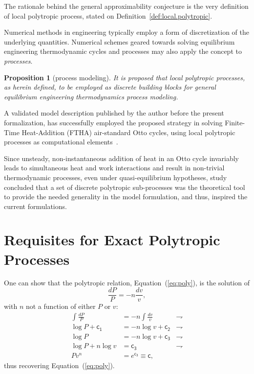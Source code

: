 \documentclass[fleqn,11pt]{SelfArx}
\newtheorem{proposition}{Proposition}
\begin{document}
    The rationale behind the general approximability conjecture is the very definition of  local
    polytropic process, stated on Definition~\ref{def:local.polytropic}.

    Numerical methods in engineering typically employ a form of discretization of the underlying
    quantities. Numerical schemes geared towards solving equilibrium  engineering  thermodynamic
    cycles and processes may also apply the concept to \emph{processes}.

    \begin{proposition}[process modeling]\label{prop:proc.model}
        It is proposed that local polytropic processes, as herein defined,  to  be  employed  as
        discrete building blocks for  general  equilibrium  engineering  thermodynamics  process
        modeling.
    \end{proposition}

    A validated model description published by the author before the present formalization,  has
    successfully employed the proposed strategy  in  solving  Finite-Time  Heat-Addition  (FTHA)
    air-standard   Otto   cycles,   using   local   polytropic   processes   as    computational
    elements~\cite{2017-NaaktgeborenC-IntJMechEngEduc}.

    Since unsteady, non-instantaneous addition of heat in an  Otto  cycle  invariably  leads  to
    simultaneous heat and work interactions and result in non-trivial  thermodynamic  processes,
    even  under  quasi-equilibrium  hypotheses,  study~\cite{2017-NaaktgeborenC-IntJMechEngEduc}
    concluded that a set of discrete  polytropic  sub-processes  was  the  theoretical  tool  to
    provide the needed generality in the model  formulation,  and  thus,  inspired  the  current
    formulations.

\section{Requisites for Exact Polytropic Processes}\label{sec:requisites}

    One can show that the polytropic relation, Equation~(\ref{eq:poly}), is the solution of
    \begin{equation}
        \frac{dP}{P} = -n\frac{dv}{v},
        \label{eq:poly.ODE}
    \end{equation}
    \noindent with $n$ not a function of either $P$ or $v$:
    \begin{align}
        \int\frac{dP}{P} & = -n\int\frac{dv}{v} & \rightharpoondown
        \\
        \log P + \mathsf{c_1} & = -n\log v + \mathsf{c_2} & \rightharpoondown
        \\
        \log P & = -n\log v + \mathsf{c_3} & \rightharpoondown
        \\
        \log P + n\log v & = \mathsf{c_3} & \rightharpoondown
        \\
        Pv^n & = e^{\mathsf{c_3}} \equiv \mathsf{c},
    \end{align}
    \noindent thus recovering Equation~(\ref{eq:poly}).
\end{document}
